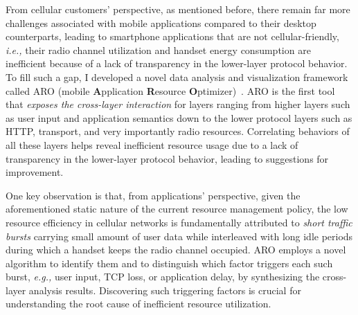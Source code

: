 \documentclass[10pt]{article}
\newcommand{\ie}{\emph{i.e.,}\xspace}
\newcommand{\eg}{\emph{e.g.,}\xspace}
\begin{document}
\begin{small}
From cellular customers' perspective, as mentioned before, there remain far more challenges associated with mobile applications compared to their desktop counterparts, leading to smartphone applications that are not cellular-friendly, \ie their radio channel utilization and handset energy consumption are inefficient because of a lack of transparency in the lower-layer protocol behavior. To fill such a gap, I developed a novel data analysis and visualization framework called ARO (mobile \textbf{A}pplication \textbf{R}esource \textbf{O}ptimizer)~\cite{qian11_mobisys}. ARO is the first tool that \emph{exposes the cross-layer interaction} for layers ranging from higher layers such as user input and application semantics down to the lower protocol layers such as HTTP, transport, and very importantly radio resources. Correlating behaviors of all these layers helps reveal inefficient resource usage due to a lack of transparency in the lower-layer protocol behavior, leading to suggestions for improvement.



One key observation is that, from applications' perspective, given the aforementioned static nature of the current resource management policy, the low resource efficiency in cellular networks is fundamentally attributed to \emph{short traffic bursts} carrying small amount of user data while interleaved with long idle periods during which a handset keeps the radio channel occupied. ARO employs a novel algorithm to identify them and to distinguish which factor triggers each such burst, \eg user input, TCP loss, or application delay, by synthesizing the cross-layer analysis results. Discovering such triggering factors is crucial for understanding the root cause of inefficient resource utilization.



\end{small}
\end{document}
